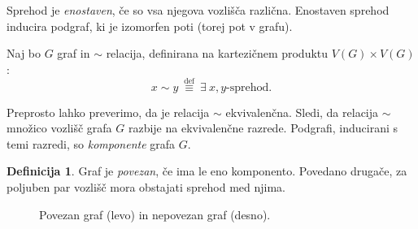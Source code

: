 \documentclass[12pt,a4paper]{amsart}
\theoremstyle{definition} %
\newtheorem{definicija}{Definicija}[section]
\theoremstyle{plain} %
\newcommand{\N}{\mathbb N}
\newcommand{\vozlisca}[1][G]{\ensuremath{V(#1)}}
\begin{document}
Sprehod je \emph{enostaven}, če so vsa njegova vozlišča različna. Enostaven sprehod inducira podgraf, ki je izomorfen poti (torej pot v grafu).


Naj bo $G$ graf in $\sim$ relacija, definirana na kartezičnem produktu $\vozlisca \times \vozlisca$:
\[ x \sim y \ \stackrel{\text{def}}{\equiv} \ \exists \ x,y \text{-sprehod.} \]

Preprosto lahko preverimo, da je relacija $\sim$ ekvivalenčna. Sledi, da relacija $\sim$ množico vozlišč grafa $G$ razbije na ekvivalenčne razrede. Podgrafi, inducirani s temi razredi, so \emph{komponente} grafa $G$.

\begin{definicija}
	Graf je \emph{povezan}, če ima le eno komponento. Povedano drugače, za poljuben par vozlišč mora obstajati sprehod med njima.
\end{definicija}

\begin{figure}[h]
    \caption{Povezan graf (levo) in nepovezan graf (desno).}
\end{figure}
\end{document}
